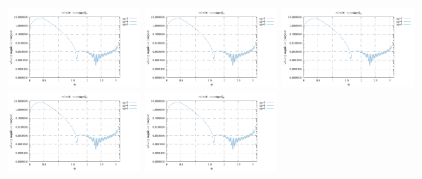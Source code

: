 \noindent
\includegraphics[width=3.5cm]{python_codes/fieldstone_152/RESULTS/exp3/vel_32_m2}
\includegraphics[width=3.5cm]{python_codes/fieldstone_152/RESULTS/exp3/vel_32_m3}
\includegraphics[width=3.5cm]{python_codes/fieldstone_152/RESULTS/exp3/vel_32_m4}
\includegraphics[width=3.5cm]{python_codes/fieldstone_152/RESULTS/exp3/vel_32_m5}
\includegraphics[width=3.5cm]{python_codes/fieldstone_152/RESULTS/exp3/vel_32_m6}

